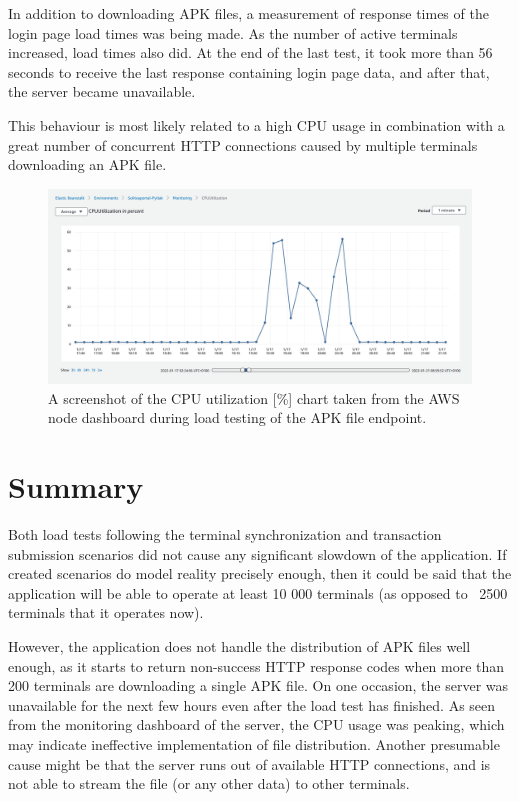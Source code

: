 \documentclass[12pt, a4paper]{article}
\let\oldsection\section
\renewcommand\section{\clearpage\oldsection}
\begin{document}
In addition to downloading APK files, a measurement of response times of the login page load times was being made.
As the number of active terminals increased, load times also did.
At the end of the last test, it took more than 56 seconds to receive the last response containing login page data, and after that, the server became unavailable.

This behaviour is most likely related to a high CPU usage in combination with a great number of concurrent HTTP connections caused by multiple terminals downloading an APK file.

\begin{figure}[!ht]
    \centering 
    \includegraphics[width=1\textwidth]{img/node-cpu-usage-2.png}
    \caption{A screenshot of the CPU utilization [\%] chart taken from the AWS node dashboard during load testing of the APK file endpoint.}
    \label{fig:cpu-usage-2}
\end{figure}

\section{Summary}
Both load tests following the terminal synchronization and transaction submission scenarios did not cause any significant slowdown of the application.
If created scenarios do model reality precisely enough, then it could be said that the application will be able to operate at least 10 000 terminals (as opposed to ~2500 terminals that it operates now).

However, the application does not handle the distribution of APK files well enough, as it starts to return non-success HTTP response codes when more than 200 terminals are downloading a single APK file.
On one occasion, the server was unavailable for the next few hours even after the load test has finished.
As seen from the monitoring dashboard of the server, the CPU usage was peaking, which may indicate ineffective implementation of file distribution.
Another presumable cause might be that the server runs out of available HTTP connections, and is not able to stream the file (or any other data) to other terminals.
\end{document}
